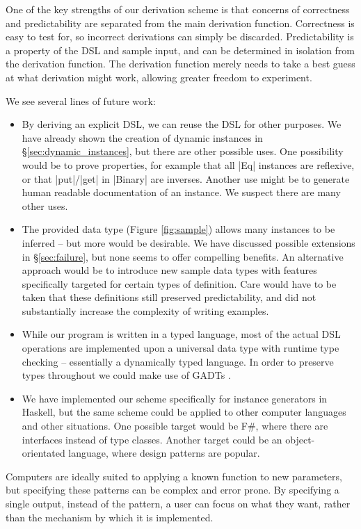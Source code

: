 \documentclass[preprint,draft]{sigplanconf}
\begin{document}
One of the key strengths of our derivation scheme is that concerns of correctness and predictability are separated from the main derivation function. Correctness is easy to test for, so incorrect derivations can simply be discarded. Predictability is a property of the DSL and sample input, and can be determined in isolation from the derivation function. The derivation function merely needs to take a best guess at what derivation might work, allowing greater freedom to experiment.

We see several lines of future work:

\begin{itemize}
\item By deriving an explicit DSL, we can reuse the DSL for other purposes. We have already shown the creation of dynamic instances in \S\ref{sec:dynamic_instances}, but there are other possible uses. One possibility would be to prove properties, for example that all |Eq| instances are reflexive, or that |put|/|get| in |Binary| are inverses. Another use might be to generate human readable documentation of an instance. We suspect there are many other uses.
\item The provided data type (Figure \ref{fig:sample}) allows many instances to be inferred -- but more would be desirable. We have discussed possible extensions in \S\ref{sec:failure}, but none seems to offer compelling benefits. An alternative approach would be to introduce new sample data types with features specifically targeted for certain types of definition. Care would have to be taken that these definitions still preserved predictability, and did not substantially increase the complexity of writing examples.
\item While our program is written in a typed language, most of the actual DSL operations are implemented upon a universal data type with runtime type checking -- essentially a dynamically typed language. In order to preserve types throughout we could make use of GADTs \cite{spj:gadt}.
\item We have implemented our scheme specifically for instance generators in Haskell, but the same scheme could be applied to other computer languages and other situations. One possible target would be F\#, where there are interfaces instead of type classes. Another target could be an object-orientated language, where design patterns \cite{design_patterns} are popular.
\end{itemize}

Computers are ideally suited to applying a known function to new parameters, but specifying these patterns can be complex and error prone. By specifying a single output, instead of the pattern, a user can focus on what they want, rather than the mechanism by which it is implemented.
\end{document}
